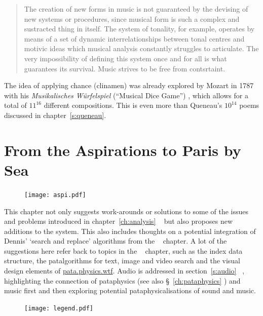 \begin{quotation}
  The creation of new forms in music is not guaranteed by the devising of new systems or procedures, since musical form is such a complex and sustracted thing in itself. The system of tonality, for example, operates by means of a set of dynamic interrelationships between tonal centres and motivic ideas which musical analysis constantly struggles to articulate. The very impossibility of defining this system once and for all is what guarantees its survival. Music strives to be free from contsrtaint. 
\end{quotation}

The idea of applying chance (clinamen) was already explored by Mozart in 1787 with his \textit{Musikalisches W\"{u}rfelspiel} (``Musical Dice Game'') \autocite{Aldenhovelnd}, which allows for a total of $11^{16}$ different compositions. This is even more than Queneau's $10^{14}$ poems discussed in chapter~\ref{s:queneau}.


\section{From the Aspirations to Paris by Sea}

\begin{figure}[!htb]
\centering
  \texttt{[image: aspi.pdf]}
\end{figure}

This chapter not only suggests work-arounds or solutions to some of the issues and problems introduced in chapter~\ref{ch:analysis} \anal~ but also proposes new additions to the system. This also includes thoughts on a potential integration of Dennis' `search and replace' algorithms from the  \appli~ chapter. A lot of the suggestions here refer back to topics in the  \imple~ chapter, such as the index data structure, the patalgorithms for text, image and video search and the visual design elements of \url{pata.physics.wtf}. Audio is addressed in section~\ref{s:audio} \aspi~, highlighting the connection of pataphysics (see also §~\ref{ch:pataphysics} \pata) and music first and then exploring potential pataphysicalisations of sound and music.

\begin{figure}[!htb]
\centering
  \texttt{[image: legend.pdf]}
\end{figure}

\stopcontents[chapters]
